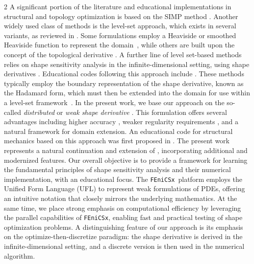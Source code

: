 \documentclass[a4paper, oneside]{article}
\newcommand{\tred}{\textcolor{red}}
\newcommand{\fx}{\texttt{FEniCSx}}
\begin{document}
\begin{multicols}{2}
A significant portion of the literature and educational implementations in structural and topology optimization is based on the SIMP method \cite{Sigmund2014}.
Another widely used class of methods is the level-set approach, which exists in several variants, as reviewed in \cite{vanDijk2013}. Some formulations employ a Heaviside or smoothed Heaviside function to represent the domain~\cite{MR1951408}, while others are built upon the concept of the topological derivative \cite{MR2235384,Novotny2013,MR4916810}.
A further line of level set-based methods relies on shape sensitivity analysis in the infinite-dimensional setting, using shape derivatives \cite{MR2731611,SokZol92}. Educational codes following this approach include \cite{Challis2009,MR2459656}. These methods typically employ the boundary representation of the shape derivative, known as the Hadamard form, which must then be extended into the domain for use within a level-set framework~\cite{MR2225309}.
In the present work, we base our approach on the so-called {\it distributed} or {\it weak shape derivative} \cite{LAURAIN2020328,MR3535238}.
This formulation offers several advantages including higher accuracy \cite{MR2642680,MR3348199},  weaker regularity requirements \cite{LAURAIN2020328}, and a natural framework for domain extension. An educational code for structural mechanics based on this approach was first proposed in \cite{MR3843884}. The present work represents a natural continuation and extension of \cite{MR3843884}, incorporating additional and modernized features.
Our overall objective is to provide a framework for learning the fundamental principles of shape sensitivity analysis and their numerical implementation, with an educational focus. 
The \fx\ platform \cite{fenicsx} employs the Unified Form Language (UFL) to represent weak formulations of PDEs, offering an intuitive notation that closely mirrors the underlying mathematics.
At the same time, we place strong emphasis on computational efficiency by leveraging the parallel capabilities of \fx, enabling fast and practical testing of shape optimization problems.
A distinguishing feature of our approach is its emphasis on the optimize-then-discretize paradigm: the shape derivative is derived in the infinite-dimensional setting, and a discrete version is then used in the numerical algorithm.



\end{multicols}
\end{document}
